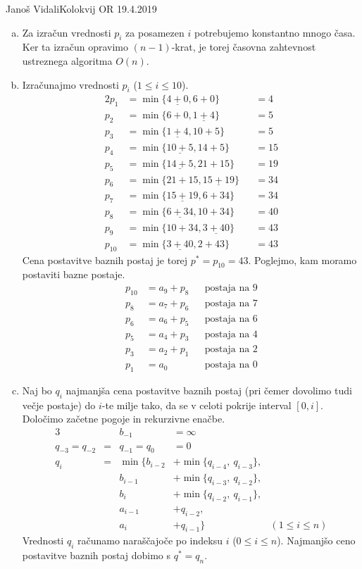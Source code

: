 \begin{naloga}{Janoš Vidali}{Kolokvij OR 19.4.2019}
\begin{odgovor}
\begin{enumerate}[(a)]
\item Za izračun vrednosti $p_i$ za posamezen $i$
potrebujemo konstantno mnogo časa.
Ker ta izračun opravimo $(n-1)$-krat,
je torej časovna zahtevnost ustreznega algoritma $O(n)$.

\item Izračunajmo vrednosti $p_i$ ($1 \le i \le 10$).
\begin{alignat*}{2}
p_1    &= \min\{\underline{4+0}, 6+0\}      &&= 4  \\
p_2    &= \min\{6+0, \underline{1+4}\}      &&= 5  \\
p_3    &= \min\{\underline{1+4}, 10+5\}     &&= 5  \\
p_4    &= \min\{\underline{10+5}, 14+5\}    &&= 15 \\
p_5    &= \min\{\underline{14+5}, 21+15\}   &&= 19 \\
p_6    &= \min\{21+15, \underline{15+19}\}  &&= 34 \\
p_7    &= \min\{\underline{15+19}, 6+34\}   &&= 34 \\
p_8    &= \min\{\underline{6+34}, 10+34\}   &&= 40 \\
p_9    &= \min\{10+34, \underline{3+40}\}   &&= 43 \\
p_{10} &= \min\{\underline{3+40}, 2+43\}    &&= 43
\end{alignat*}
Cena postavitve baznih postaj je torej $p^* = p_{10} = 43$.
Poglejmo, kam moramo postaviti bazne postaje.
\begin{align*}
p_{10} &= a_9 + p_8 && \text{postaja na $9$} \\
p_8    &= a_7 + p_6 && \text{postaja na $7$} \\
p_6    &= a_6 + p_5 && \text{postaja na $6$} \\
p_5    &= a_4 + p_3 && \text{postaja na $4$} \\
p_3    &= a_2 + p_1 && \text{postaja na $2$} \\
p_1    &= a_0       && \text{postaja na $0$}
\end{align*}

\item Naj bo $q_i$ najmanjša cena postavitve baznih postaj
(pri čemer dovolimo tudi večje postaje)
do $i$-te milje tako,
da se v celoti pokrije interval $[0, i]$.
Določimo začetne pogoje in rekurzivne enačbe.
\begin{alignat*}{3}
&& b_{-1} &= \infty \\
q_{-3} = q_{-2} &=& q_{-1} = q_0 &= 0 \\
q_i &=&{} \min\{b_{i-2} &+ \min\{q_{i-4},\ q_{i-3}\}, \\
    & &         b_{i-1} &+ \min\{q_{i-3},\ q_{i-2}\}, \\
    & &         b_i &+ \min\{q_{i-2},\ q_{i-1}\}, \\
    & &         a_{i-1} &+ q_{i-2}, \\
    & &         a_i &+ q_{i-1}\} & (1 \le i \le n)
\end{alignat*}
Vrednosti $q_i$ računamo naraščajoče po indeksu $i$ ($0 \le i \le n$).
Najmanjšo ceno postavitve baznih postaj dobimo s $q^* = q_n$.


\end{enumerate}
\end{odgovor}
\end{naloga}
